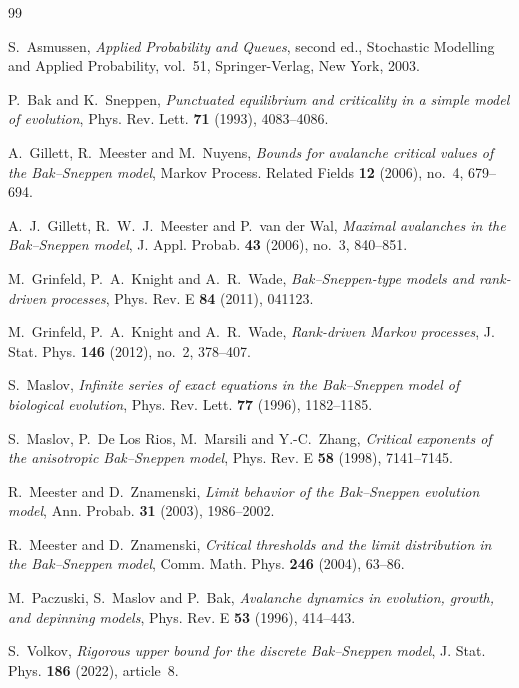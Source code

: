 \documentclass[11pt,a4paper]{amsart}
\theoremstyle{remark}
\begin{document}
\begin{thebibliography}{99}

S.~Asmussen,
\emph{Applied Probability and Queues},
second ed., Stochastic Modelling and Applied Probability, vol.~51,
Springer-Verlag, New York, 2003.

P.~Bak and K.~Sneppen,
\emph{Punctuated equilibrium and criticality in a simple model of evolution},
Phys. Rev. Lett. \textbf{71} (1993), 4083--4086.

A.~Gillett, R.~Meester and M.~Nuyens,
\emph{Bounds for avalanche critical values of the Bak--Sneppen model},
Markov Process. Related Fields \textbf{12} (2006), no.~4, 679--694.

A.~J.~Gillett, R.~W.~J.~Meester and P.~van der Wal,
\emph{Maximal avalanches in the Bak--Sneppen model},
J. Appl. Probab. \textbf{43} (2006), no.~3, 840--851.

M.~Grinfeld, P.~A.~Knight and A.~R.~Wade,
\emph{Bak--Sneppen-type models and rank-driven processes},
Phys. Rev. E \textbf{84} (2011), 041123.

M.~Grinfeld, P.~A.~Knight and A.~R.~Wade,
\emph{Rank-driven Markov processes},
J. Stat. Phys. \textbf{146} (2012), no.~2, 378--407.

S.~Maslov,
\emph{Infinite series of exact equations in the Bak--Sneppen model of
biological evolution},
Phys. Rev. Lett. \textbf{77} (1996), 1182--1185.

S.~Maslov, P.~De Los Rios, M.~Marsili and Y.-C.~Zhang,
\emph{Critical exponents of the anisotropic Bak--Sneppen model},
Phys. Rev. E \textbf{58} (1998), 7141--7145.

R.~Meester and D.~Znamenski,
\emph{Limit behavior of the Bak--Sneppen evolution model},
Ann. Probab. \textbf{31} (2003), 1986--2002.

R.~Meester and D.~Znamenski,
\emph{Critical thresholds and the limit distribution in the Bak--Sneppen
model},
Comm. Math. Phys. \textbf{246} (2004), 63--86.

M.~Paczuski, S.~Maslov and P.~Bak,
\emph{Avalanche dynamics in evolution, growth, and depinning models},
Phys. Rev. E \textbf{53} (1996), 414--443.

S.~Volkov,
\emph{Rigorous upper bound for the discrete Bak--Sneppen model},
J. Stat. Phys. \textbf{186} (2022), article~8.

\end{thebibliography}
\end{document}
